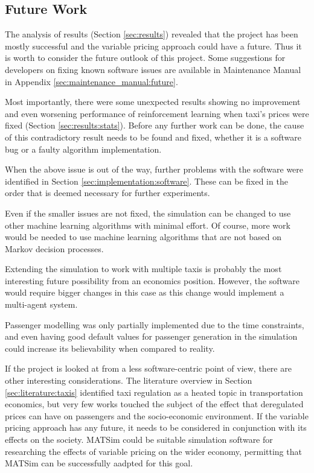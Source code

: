 \subsection{Future Work}

The analysis of results (Section \ref{sec:results}) revealed that the project
has been mostly successful and the variable pricing approach could have a
future. Thus it is worth to consider the future outlook of this project. Some
suggestions for developers on fixing known software issues are available in
Maintenance Manual in Appendix \ref{sec:maintenance_manual:future}.

Most importantly, there were some unexpected results showing no improvement and
even worsening performance of reinforcement learning when taxi's prices were
fixed (Section \ref{sec:results:stats}). Before any further work can be done,
the cause of this contradictory result needs to be found and fixed, whether it
is a software bug or a faulty algorithm implementation.

When the above issue is out of the way, further problems with the software were
identified in Section \ref{sec:implementation:software}. These can be fixed in
the order that is deemed necessary for further experiments. 

Even if the smaller issues are not fixed, the simulation can be changed to use
other machine learning algorithms with minimal effort. Of course, more work
would be needed to use machine learning algorithms that are not based on Markov
decision processes.

Extending the simulation to work with multiple taxis is probably the most
interesting future possibility from an economics position. However, the
software would require bigger changes in this case as this change would
implement a multi-agent system.

Passenger modelling was only partially implemented due to the time constraints,
and even having good default values for passenger generation in the simulation
could increase its believability when compared to reality.

If the project is looked at from a less software-centric point of view, there
are other interesting considerations. The literature overview in Section
\ref{sec:literature:taxis} identified taxi regulation as a heated topic in
transportation economics, but very few works touched the subject of the effect
that deregulated prices can have on passengers and the socio-economic
environment. If the variable pricing approach has any future, it needs to be
considered in conjunction with its effects on the society. MATSim could be
suitable simulation software for researching the effects of variable pricing on
the wider economy, permitting that MATSim can be successfully aadpted for this
goal.
